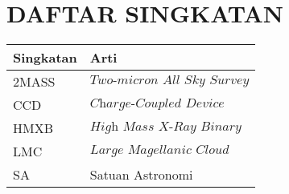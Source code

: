 \chapter{DAFTAR SINGKATAN}
\label{chp:singkatan}
\vspace{1.0cm}
\begin{table}[h!]
  \small
  \label{tab:singkatan}
  \begin{center}
    \begin{tabular}{ll}
      \hline
      \textbf{Singkatan} & \textbf{Arti}                        \\
      \hline
      2MASS              & $\textit{Two-micron All Sky Survey}$ \\
      CCD                & $\textit{Charge-Coupled Device}$     \\
      HMXB               & $\textit{High Mass X-Ray Binary}$    \\
      LMC                & $\textit{Large Magellanic Cloud}$    \\
      SA                 & Satuan Astronomi                     \\
      \hline
    \end{tabular}
  \end{center}
\end{table}

